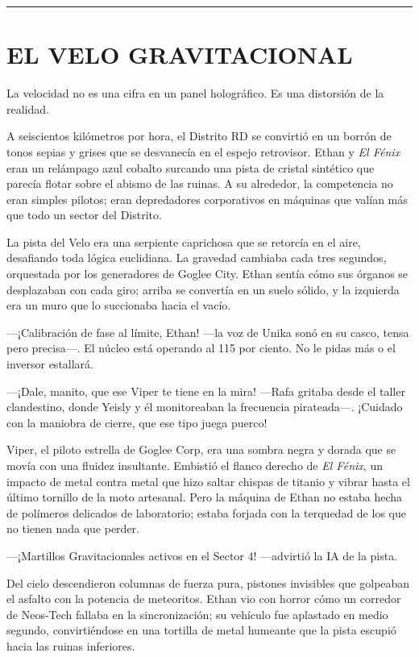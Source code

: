 \documentclass[12pt,a4paper]{book}
\begin{document}
\bigskip
\noindent\rule{\textwidth}{0.4pt}
\bigskip

\chapter{EL VELO GRAVITACIONAL}

La velocidad no es una cifra en un panel holográfico. Es una distorsión de la realidad.

A seiscientos kilómetros por hora, el Distrito RD se convirtió en un borrón de tonos sepias y grises que se desvanecía en el espejo retrovisor. Ethan y \textit{El Fénix} eran un relámpago azul cobalto surcando una pista de cristal sintético que parecía flotar sobre el abismo de las ruinas. A su alrededor, la competencia no eran simples pilotos; eran depredadores corporativos en máquinas que valían más que todo un sector del Distrito.

La pista del Velo era una serpiente caprichosa que se retorcía en el aire, desafiando toda lógica euclidiana. La gravedad cambiaba cada tres segundos, orquestada por los generadores de Goglee City. Ethan sentía cómo sus órganos se desplazaban con cada giro; arriba se convertía en un suelo sólido, y la izquierda era un muro que lo succionaba hacia el vacío.

---¡Calibración de fase al límite, Ethan! ---la voz de Unika sonó en su casco, tensa pero precisa---. El núcleo está operando al 115 por ciento. No le pidas más o el inversor estallará.

---¡Dale, manito, que ese Viper te tiene en la mira! ---Rafa gritaba desde el taller clandestino, donde Yeisly y él monitoreaban la frecuencia pirateada---. ¡Cuidado con la maniobra de cierre, que ese tipo juega puerco!

Viper, el piloto estrella de Goglee Corp, era una sombra negra y dorada que se movía con una fluidez insultante. Embistió el flanco derecho de \textit{El Fénix}, un impacto de metal contra metal que hizo saltar chispas de titanio y vibrar hasta el último tornillo de la moto artesanal. Pero la máquina de Ethan no estaba hecha de polímeros delicados de laboratorio; estaba forjada con la terquedad de los que no tienen nada que perder.

---¡Martillos Gravitacionales activos en el Sector 4! ---advirtió la IA de la pista.

Del cielo descendieron columnas de fuerza pura, pistones invisibles que golpeaban el asfalto con la potencia de meteoritos. Ethan vio con horror cómo un corredor de Neos-Tech fallaba en la sincronización; su vehículo fue aplastado en medio segundo, convirtiéndose en una tortilla de metal humeante que la pista escupió hacia las ruinas inferiores.
\end{document}

